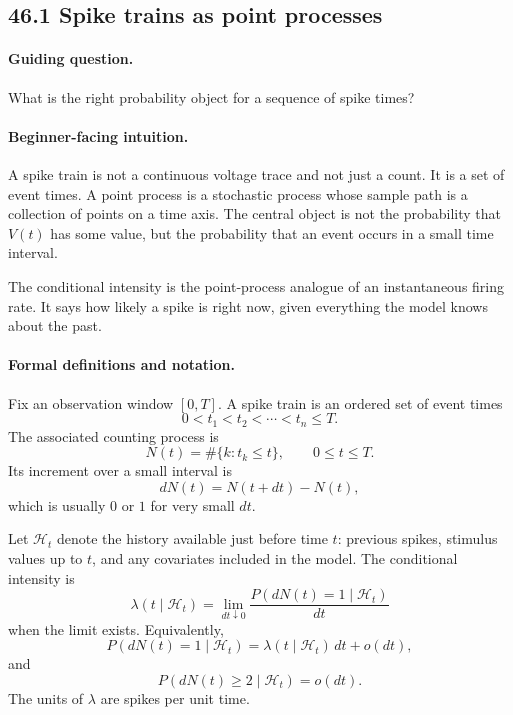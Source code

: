 \subsection{46.1 Spike trains as point processes}

\paragraph{Guiding question.}
What is the right probability object for a sequence of spike times?

\paragraph{Beginner-facing intuition.}
A spike train is not a continuous voltage trace and not just a count. It is a set of event times. A point process is a stochastic process whose sample path is a collection of points on a time axis. The central object is not the probability that \(V(t)\) has some value, but the probability that an event occurs in a small time interval.

The conditional intensity is the point-process analogue of an instantaneous firing rate. It says how likely a spike is right now, given everything the model knows about the past.

\paragraph{Formal definitions and notation.}
Fix an observation window \([0,T]\). A spike train is an ordered set of event times
\[
0<t_1<t_2<\cdots<t_n\leq T.
\]
The associated counting process is
\[
N(t)=\#\{k:t_k\leq t\},\qquad 0\leq t\leq T.
\]
Its increment over a small interval is
\[
dN(t)=N(t+dt)-N(t),
\]
which is usually \(0\) or \(1\) for very small \(dt\).

Let \(\mathcal H_t\) denote the history available just before time \(t\): previous spikes, stimulus values up to \(t\), and any covariates included in the model. The conditional intensity is
\[
\boxed{
\lambda(t\mid\mathcal H_t)
=\lim_{dt\downarrow0}
\frac{P(dN(t)=1\mid\mathcal H_t)}{dt}
}
\]
when the limit exists. Equivalently,
\[
P(dN(t)=1\mid\mathcal H_t)=\lambda(t\mid\mathcal H_t)\,dt+o(dt),
\]
and
\[
P(dN(t)\geq2\mid\mathcal H_t)=o(dt).
\]
The units of \(\lambda\) are spikes per unit time.

